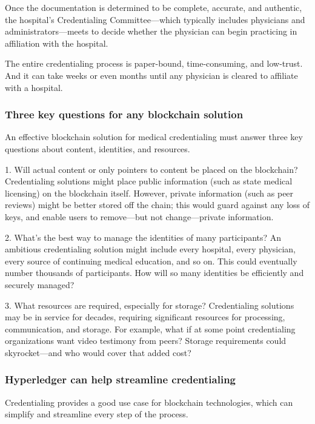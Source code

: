 Once the documentation is determined to be complete, accurate, and authentic, the hospital's
Credentialing Committee---which typically includes physicians and administrators---meets to decide whether the physician can begin practicing in affiliation with the hospital.

The entire credentialing process is paper-bound, time-consuming, and low-trust. And it can take weeks or even months until any physician is cleared to affiliate with a hospital.

\subsubsection{Three key questions for any blockchain solution}
An effective blockchain solution for medical credentialing must answer three key questions about content, identities, and resources.

1. Will actual content or only pointers to content be placed on the blockchain? 
Credentialing solutions might place public information (such as state medical licensing) on the blockchain itself.  
However, private information (such as peer reviews) might be better stored off the chain; this would guard against any loss of keys, and enable users to remove---but not change---private information.  

2. What's the best way to manage the identities of many participants? 
An ambitious credentialing solution might include every hospital, every physician, every source of continuing medical education, and so on. 
This could eventually number thousands of participants. 
How will so many identities be efficiently and securely managed?

3. What resources are required, especially for storage? 
Credentialing solutions may be in service for decades, requiring significant resources for processing, communication, and storage. 
For example, what if at some point credentialing organizations want video testimony from peers? Storage requirements could skyrocket---and who would cover that added cost? 

\subsubsection{Hyperledger can help streamline credentialing}
Credentialing provides a good use case for blockchain technologies, which can simplify and streamline every step of the process. 

